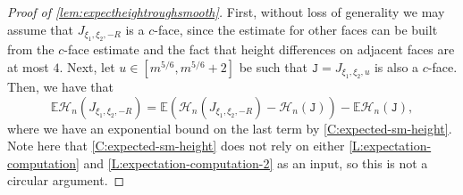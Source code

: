 \documentclass[11pt,twoside]{amsart}
\theoremstyle{plain}
\numberwithin{quest}{section}
\theoremstyle{remark}
\numberwithin{rem}{section}
\theoremstyle{definition}
\begin{document}
	\begin{proof}[Proof of \cref{lem:expectheightroughsmooth}]
		First, without loss of generality we may assume that $J_{\xi_1,\xi_2,-R}$ is a $c$-face, since the estimate for other faces can be built from the $c$-face estimate and the fact that height differences on adjacent faces are at most $4$. Next, let $u \in [m^{5/6}, m^{5/6} + 2]$ be such that $\mathtt{J} = J_{\xi_1,\xi_2,u}$ is also a $c$-face. Then, we have that 
		\begin{equation*}
			\mathbb{E}\mathcal{H}_n(J_{\xi_1,\xi_2,-R})=\mathbb{E}(\mathcal{H}_n(J_{\xi_1,\xi_2,-R})-\mathcal{H}_n(\mathtt{J})) -\mathbb{E}\mathcal{H}_n(\mathtt{J}),
		\end{equation*}
		where we have an exponential bound on the last term by \cref{C:expected-sm-height}. Note here that \cref{C:expected-sm-height} does not rely on either \cref{L:expectation-computation} and \cref{L:expectation-computation-2} as an input, so this is not a circular argument. 
		

\end{proof}
\end{document}
